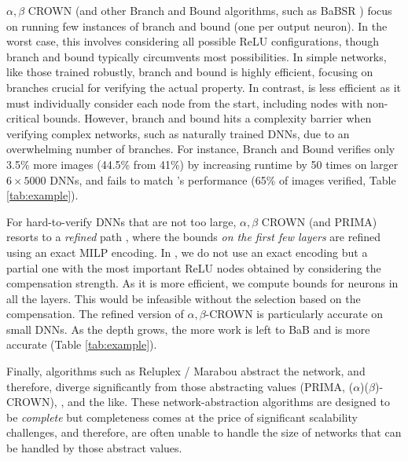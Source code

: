 $\alpha,\beta$ CROWN \cite{crown} (and other Branch and Bound algorithms, such as BaBSR \cite{BaB}) focus on running few instances of branch and bound (one per output neuron).  In the worst case, this involves considering all possible ReLU configurations, though branch and bound typically circumvents most possibilities. In simple networks, like those trained robustly, branch and bound is highly efficient, focusing on branches crucial for verifying the actual property. In contrast, {\CMP} is less efficient as it must individually consider each node from the start, including nodes with non-critical bounds. However, branch and bound hits a complexity barrier when verifying complex networks, such as naturally trained DNNs, due to an overwhelming number of branches. For instance, Branch and Bound verifies only 3.5\% more images (44.5\% from 41\%) by increasing runtime by 50 times on larger $6 \times 5000$ DNNs, and fails to match {\CMP}'s performance (65\% of images verified, Table \ref{tab:example}). 

For hard-to-verify DNNs that are not too large,  $\alpha,\beta$ CROWN (and PRIMA) resorts to a {\em refined} path \cite{MILP2}, where the bounds {\em on the first few layers} are refined using an exact MILP encoding. In {\CMP}, we do not use an exact encoding but a partial one with the most important ReLU nodes obtained by considering the compensation strength. As it is more efficient, we compute bounds for neurons in all the layers. This would be infeasible without the selection based on the compensation. The refined version of $\alpha,\beta$-CROWN is particularly accurate on small DNNs. As the depth grows, the more work is left to BaB and \CMP is more accurate (Table \ref{tab:example}).

Finally, algorithms such as Reluplex / Marabou \cite{Reluplex,katz2019marabou}  abstract the network, and therefore,  diverge significantly from those abstracting values (PRIMA, ($\alpha$)($\beta$)-CROWN)\cite{prima,crown}, {\CMP}, and the like. These network-abstraction algorithms are designed to be {\em complete} but completeness comes at the price of significant scalability challenges, and therefore, are often unable to handle the size of networks that can be handled by those abstract values. 

